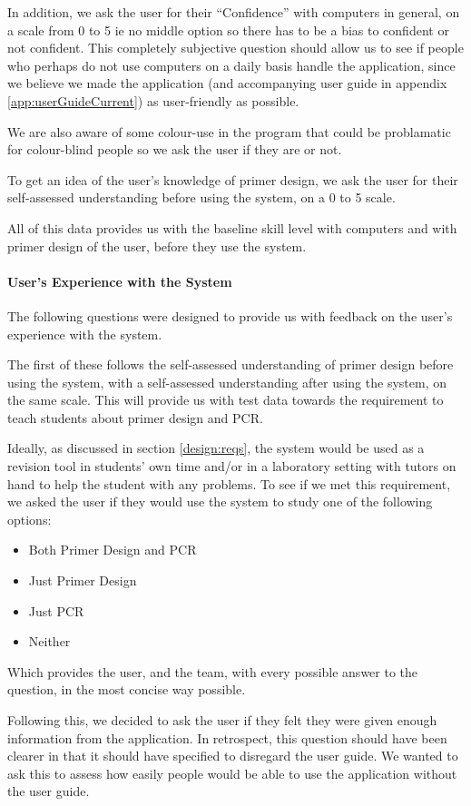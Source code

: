 In addition, we ask the user for their ``Confidence'' with computers
in general, on a scale from 0 to 5 ie no middle option so there has
to be a bias to confident or not confident.
This completely subjective question should allow us to see if people
who perhaps do not use computers on a daily basis handle the
application, since we believe we made the application (and
accompanying user guide in appendix \ref{app:userGuideCurrent}) as
user-friendly as possible.

We are also aware of some colour-use in the program that could be
problamatic for colour-blind people so we ask the user if they are or
not.

To get an idea of the user's knowledge of primer design, we ask the
user for their self-assessed understanding before using the system, on
a 0 to 5 scale.

All of this data provides us with the baseline skill level with
computers and with primer design of the user, before they use the
system.

\paragraph{User's Experience with the System}
The following questions were designed to provide us with feedback on
the user's experience with the system.

The first of these follows the self-assessed understanding of primer
design before using the system, with a self-assessed understanding
after using the system, on the same scale.
This will provide us with test data towards the requirement to teach
students about primer design and PCR.

Ideally, as discussed in section \ref{design:reqs}, the system would
be used as a revision tool in students' own time and/or in a
laboratory setting with tutors on hand to help the student with any
problems.
To see if we met this requirement, we asked the user if they would use
the system to study one of the following options:
\begin{itemize}
\item Both Primer Design and PCR
\item Just Primer Design
\item Just PCR
\item Neither
\end{itemize}
Which provides the user, and the team, with every possible answer to
the question, in the most concise way possible.

Following this, we decided to ask the user if they felt they were
given enough information from the application.
In retrospect, this question should have been clearer in that it
should have specified to disregard the user guide.
We wanted to ask this to assess how easily people would be able to use
the application without the user guide.

